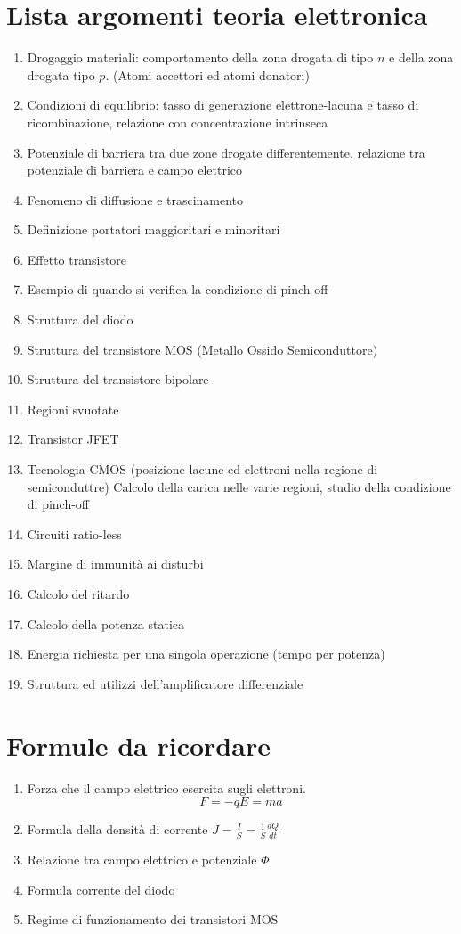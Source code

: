 \documentclass{article}
\begin{document}
\section*{Lista argomenti teoria elettronica}
\begin{enumerate}
    \item Drogaggio materiali: comportamento della zona drogata di tipo $n$ e della zona drogata tipo $p$. (Atomi accettori ed atomi donatori)
    \item Condizioni di equilibrio: tasso di generazione elettrone-lacuna e tasso di ricombinazione, relazione con concentrazione intrinseca
   \item Potenziale di barriera tra due zone drogate differentemente, relazione tra potenziale di barriera e campo elettrico
   \item Fenomeno di diffusione e trascinamento
   \item Definizione portatori maggioritari e minoritari
   \item Effetto transistore
   \item Esempio di quando si verifica la condizione di pinch-off
   \item Struttura del diodo
   \item Struttura del transistore MOS (Metallo Ossido Semiconduttore)
   \item Struttura del transistore bipolare
   \item Regioni svuotate
   \item Transistor JFET
   \item Tecnologia CMOS (posizione lacune ed elettroni nella regione di semiconduttre)
       Calcolo della carica nelle varie regioni, studio della condizione di pinch-off
   \item Circuiti ratio-less
   \item Margine di immunità ai disturbi
   \item Calcolo del ritardo
   \item Calcolo della potenza statica
   \item Energia richiesta per una singola operazione (tempo per potenza)
   \item Struttura ed utilizzi dell'amplificatore differenziale
\end{enumerate}

\section*{Formule da ricordare}
\begin{enumerate}
    \item
        Forza che il campo elettrico esercita sugli elettroni.
        \[
        F = -q E = ma
    \]

    \item Formula della densità di corrente $J = \frac{I}{S} = \frac{1}{S}\frac{dQ}{dt}$
    \item Relazione tra campo elettrico e potenziale $\Phi$
    \item Formula corrente del diodo
    \item Regime di funzionamento dei transistori MOS
\end{enumerate}
\end{document}
